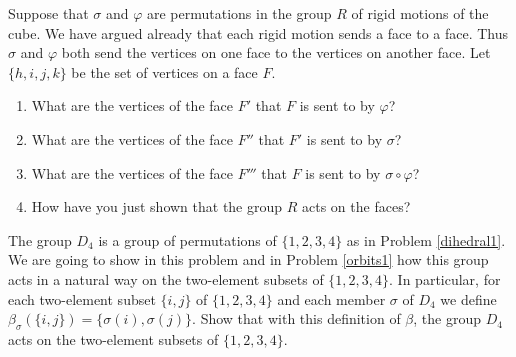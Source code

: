 \bp 
\iteme Suppose that $\sigma$ and $\varphi$ are permutations in the group
$R$ of rigid motions of the cube. We have argued already that each rigid
motion sends a face to a face.  Thus $\sigma$ and $\varphi$ both send the
vertices on one face to the vertices on another face. Let
$\{h,i,j,k\}$ be the set of vertices on a face $F$.
\begin{enumerate}
\item  What
are the vertices of the face
$F'$ that
$F$ is sent to by $\varphi$?  
\item What are the vertices of the face $F''$
that
$F'$ is sent to by $\sigma$? 
\item What are the vertices of the face $F'''$
that $F$ is sent to by $\sigma\circ\varphi$? 
\item How have you just shown
that the group
$R$ acts on the faces?
\end{enumerate}
\iteme The group $D_4$ is a group of permutations of
$\{1,2,3,4\}$ as in Problem \ref{dihedral1}.  We are going to show in this 
problem and in Problem
\ref{orbits1} how this group acts in a natural way on the two-element subsets of
$\{1,2,3,4\}$.  In particular, for each two-element subset $\{i,j\}$ of
$\{1,2,3,4\}$ and each member
$\sigma$ of
$D_4$ we define $\beta_{\sigma}(\{i,j\}) = \{\sigma(i),\sigma(j)\}$. 
Show that with this definition of $\beta$, the group $D_4$ acts on the
two-element subsets of $\{1,2,3,4\}$.\label{D_4on2-sets}
